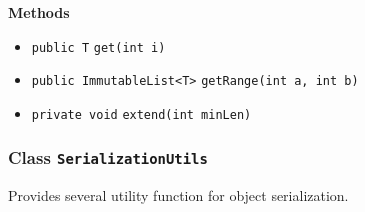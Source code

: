 \textbf{\sffamily Methods}
\begin{itemize}
\item \lstinline|public T| \lstinline|get|\lstinline|(int i)| \\[-0.6em]




\item \lstinline|public ImmutableList<T>| \lstinline|getRange|\lstinline|(int a, int b)| \\[-0.6em]




\item \lstinline|private void| \lstinline|extend|\lstinline|(int minLen)| \\[-0.6em]




\end{itemize}

\subsubsection{Class \lstinline|SerializationUtils|}
Provides several utility function for object serialization. \\
\noindent\begin{minipage}[t]{5cm}
\vspace{0.3em}
\hspace*{2em}
\vspace{0.3em}
\end{minipage}





